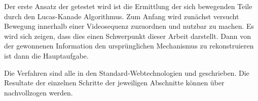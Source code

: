 Der erste Ansatz der getestet wird ist die Ermittlung der sich bewegenden Teile durch den Lucas-Kanade Algorithmus. %
Zum Anfang wird zunächst versucht Bewegung innerhalb einer Videosequenz zuzuordnen und nutzbar zu machen.
Es wird sich zeigen, dass dies einen Schwerpunkt dieser Arbeit darstellt.
Dann von der gewonnenen Information den ursprünglichen Mechanismus zu rekonstruieren ist dann die Hauptaufgabe.

Die Verfahren sind alle in den Standard-Webtechnologien  und  geschrieben.
Die Resultate der einzelnen Schritte der jeweiligen Abschnitte können über  nachvollzogen werden.
